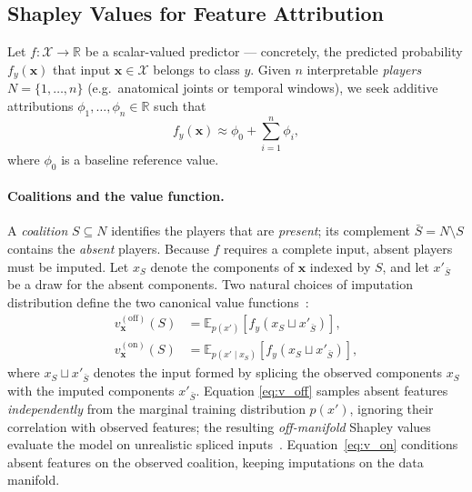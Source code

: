 
\subsection{Shapley Values for Feature Attribution}

Let $f : \mathcal{X} \to \mathbb{R}$ be a scalar-valued predictor — concretely, the predicted probability $f_y(\mathbf{x})$ that input $\mathbf{x} \in \mathcal{X}$ belongs to class $y$. Given $n$ interpretable \emph{players} $N = \{1, \ldots, n\}$ (e.g.\ anatomical joints or temporal windows), we seek additive attributions $\phi_1, \ldots, \phi_n \in \mathbb{R}$ such that
\begin{equation}
  f_y(\mathbf{x}) \approx \phi_0 + \sum_{i=1}^{n} \phi_i,
  \label{eq:additive}
\end{equation}
where $\phi_0$ is a baseline reference value.

\paragraph{Coalitions and the value function.}
A \emph{coalition} $S \subseteq N$ identifies the players that are \emph{present}; its complement $\bar{S} = N \setminus S$ contains the \emph{absent} players. Because $f$ requires a complete input, absent players must be imputed. Let $x_S$ denote the components of $\mathbf{x}$ indexed by $S$, and let $x'_{\bar{S}}$ be a draw for the absent components. Two natural choices of imputation distribution define the two canonical value functions~\citep{frye2020shapley}:
\begin{align}
  v^{(\mathrm{off})}_\mathbf{x}(S)
    &= \mathbb{E}_{p(x')}\!\left[
        f_y\!\left(x_S \sqcup x'_{\bar{S}}\right)
      \right],
  \label{eq:v_off} \\[4pt]
  v^{(\mathrm{on})}_\mathbf{x}(S)
    &= \mathbb{E}_{p(x' \mid x_S)}\!\left[
        f_y\!\left(x_S \sqcup x'_{\bar{S}}\right)
      \right],
  \label{eq:v_on}
\end{align}
where $x_S \sqcup x'_{\bar{S}}$ denotes the input formed by splicing the observed components $x_S$ with the imputed components $x'_{\bar{S}}$. Equation \eqref{eq:v_off} samples absent features \emph{independently} from the marginal training distribution $p(x')$, ignoring their correlation with observed features; the resulting \emph{off-manifold} Shapley values evaluate the model on unrealistic spliced inputs~\citep{frye2020shapley}. Equation~\eqref{eq:v_on} conditions absent features on the observed coalition, keeping imputations on the data manifold.

